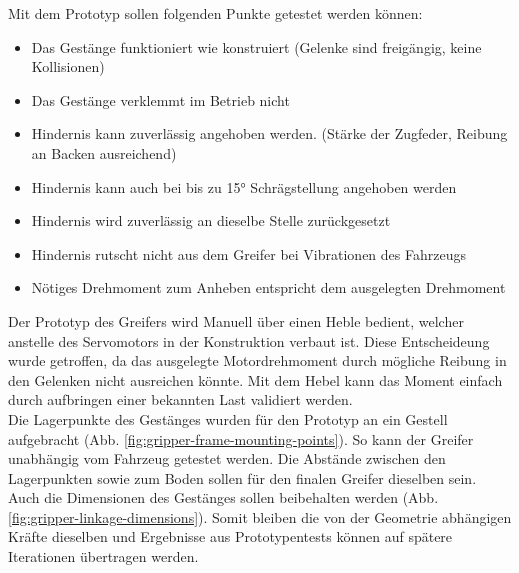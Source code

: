 Mit dem Prototyp sollen folgenden Punkte getestet werden können:
\begin{itemize}
    \item Das Gestänge funktioniert wie konstruiert (Gelenke sind freigängig, keine Kollisionen)
    \item Das Gestänge verklemmt im Betrieb nicht 
    \item Hindernis kann zuverlässig angehoben werden. (Stärke der Zugfeder, Reibung an Backen ausreichend)
    \item Hindernis kann auch bei bis zu 15° Schrägstellung angehoben werden
    \item Hindernis wird zuverlässig an dieselbe Stelle zurückgesetzt
    \item Hindernis rutscht nicht aus dem Greifer bei Vibrationen des Fahrzeugs
    \item  Nötiges Drehmoment zum Anheben entspricht dem ausgelegten Drehmoment
\end{itemize}

Der Prototyp des Greifers wird Manuell über einen Heble bedient, welcher anstelle des Servomotors in der Konstruktion verbaut ist. Diese Entscheideung wurde getroffen, da das ausgelegte Motordrehmoment durch mögliche Reibung in den Gelenken nicht ausreichen könnte. Mit dem Hebel kann das Moment einfach durch aufbringen einer bekannten Last validiert werden.
\\
Die Lagerpunkte des Gestänges wurden für den Prototyp an ein Gestell aufgebracht (Abb. \ref{fig:gripper-frame-mounting-points}). So kann der Greifer unabhängig vom Fahrzeug getestet werden. Die Abstände zwischen den Lagerpunkten sowie zum Boden sollen für den finalen Greifer dieselben sein. Auch die Dimensionen des Gestänges sollen beibehalten werden (Abb. \ref{fig:gripper-linkage-dimensions}). Somit bleiben die von der Geometrie abhängigen Kräfte dieselben und Ergebnisse aus Prototypentests können auf spätere Iterationen übertragen werden.

